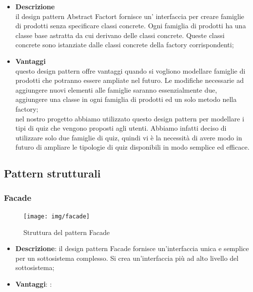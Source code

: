 		\begin{itemize}
			\item \textbf{Descrizione}\\ il design pattern Abstract Factort fornisce un' interfaccia per creare famiglie di prodotti senza specificare classi concrete. Ogni famiglia di prodotti ha una classe base astratta da cui derivano delle classi concrete. Queste classi concrete sono istanziate dalle classi concrete della factory corrispondenti;
			
			\item \textbf{Vantaggi}\\ questo design pattern offre vantaggi quando si vogliono modellare famiglie di prodotti che potranno essere ampliate nel futuro. Le modifiche necessarie ad aggiungere nuovi elementi alle famiglie saranno essenzialmente due, aggiungere una classe in ogni famiglia di prodotti ed un solo metodo nella factory;
			\utilizzo \\ nel nostro progetto abbiamo utilizzato questo design pattern per modellare i tipi di quiz che vengono proposti agli utenti. Abbiamo infatti deciso di utilizzare solo due famiglie di quiz, quindi vi è la necessità di avere modo in futuro di ampliare le tipologie di quiz disponibili in modo semplice ed efficace.
			
		\end{itemize}
		
\subsection{Pattern strutturali}
	\subsubsection{Facade}
	
	\begin{figure}[!h]
		\centering
		\texttt{[image: img/facade]}  
		\caption{Struttura del pattern Facade}
	\end{figure}
	
		\begin{itemize}
			\item \textbf{Descrizione}: il design pattern Facade fornisce un'interfaccia unica e semplice per un sottosistema complesso. Si crea un'interfaccia più ad alto livello del sottosistema;
			\item \textbf{Vantaggi}: 
			\utilizzo: %
		\end{itemize}
